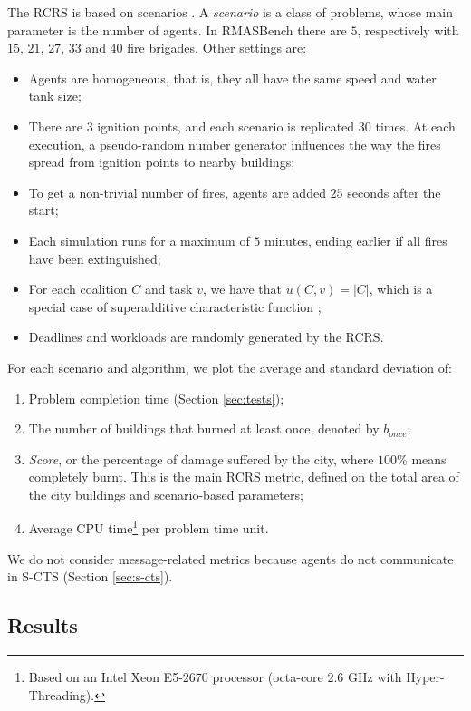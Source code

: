 The RCRS is based on scenarios \cite{rcrsmanual}. A \emph{scenario} is a class of
problems, whose main parameter is the number of agents. In RMASBench there are $5$,
respectively with $15$, $21$, $27$, $33$ and $40$ fire brigades. Other settings are:
\begin{itemize}
    \item Agents are homogeneous, that is, they all have the same speed and water tank
        size;
    \item There are $3$ ignition points, and each scenario is replicated $30$ times. At
        each execution, a pseudo-random number generator influences the way the fires
        spread from ignition points to nearby buildings;
    \item To get a non-trivial number of fires, agents are added $25$ seconds after
        the start;
    \item Each simulation runs for a maximum of $5$ minutes, ending earlier if all fires
        have been extinguished;
    \item For each coalition $C$ and task $v$, we have that $u(C, v) = |C|$, which is a
        special case of superadditive characteristic function \cite[Section
        $2.1.2.2$]{chalkiadakis2011};
    \item Deadlines and workloads are randomly generated by the RCRS.
\end{itemize}
For each scenario and algorithm, we plot the average and standard deviation of:
\begin{enumerate}
    \item Problem completion time (Section \ref{sec:tests});
    \item The number of buildings that burned at least once, denoted by $b_{once}$;
    \item \emph{Score}, or the percentage of damage suffered by the city, where $100\%$
        means completely burnt. This is the main RCRS metric, defined on the total area of
        the city buildings and scenario-based parameters;
    \item Average CPU time\footnote{Based on an Intel Xeon E5-2670 processor (octa-core
        2.6 GHz with Hyper-Threading).} per problem time unit.
\end{enumerate}
We do not consider message-related metrics because agents do not communicate in S-CTS
(Section \ref{sec:s-cts}).

\subsection{Results}\label{sec:roboresults}

